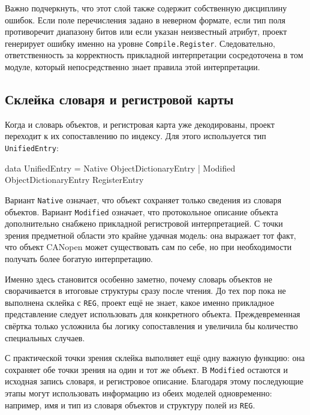 \documentclass[a4paper,12pt]{article}
\begin{document}
Важно подчеркнуть, что этот слой также содержит собственную дисциплину ошибок. Если
поле перечисления задано в неверном формате, если тип поля противоречит диапазону битов
или если указан неизвестный атрибут, проект генерирует ошибку именно на уровне
\texttt{Compile.Register}. Следовательно, ответственность за корректность прикладной
интерпретации сосредоточена в том модуле, который непосредственно знает правила этой
интерпретации.

\subsection{Склейка словаря и регистровой карты}

Когда и словарь объектов, и регистровая карта уже декодированы, проект переходит к их
сопоставлению по индексу. Для этого используется тип \texttt{UnifiedEntry}:

\begin{flushleft}
\label{lst:unified-entry}
\begin{MyCodes}
data UnifiedEntry
  = Native ObjectDictionaryEntry
  | Modified ObjectDictionaryEntry RegisterEntry
\end{MyCodes}
\end{flushleft}

Вариант \texttt{Native} означает, что объект сохраняет только сведения из словаря
объектов. Вариант \texttt{Modified} означает, что протокольное описание объекта
дополнительно снабжено прикладной регистровой интерпретацией. С точки зрения предметной
области это крайне удачная модель: она выражает тот факт, что объект CANopen может
существовать сам по себе, но при необходимости получать более богатую интерпретацию.

Именно здесь становится особенно заметно, почему словарь объектов не сворачивается в
итоговые структуры сразу после чтения. До тех пор пока не выполнена склейка с
\texttt{REG}, проект ещё не знает, какое именно прикладное представление следует
использовать для конкретного объекта. Преждевременная свёртка только усложнила бы
логику сопоставления и увеличила бы количество специальных случаев.

С практической точки зрения склейка выполняет ещё одну важную функцию: она сохраняет
обе точки зрения на один и тот же объект. В \texttt{Modified} остаются и исходная запись
словаря, и регистровое описание. Благодаря этому последующие этапы могут использовать
информацию из обеих моделей одновременно: например, имя и тип из словаря объектов и
структуру полей из \texttt{REG}.
\end{document}
